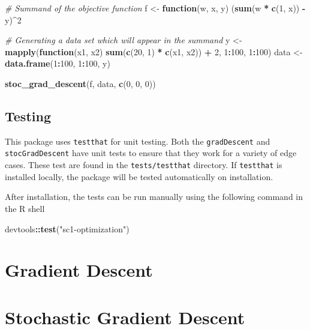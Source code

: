 \documentclass[12pt,]{article}
\newenvironment{Shaded}{\begin{snugshade}}{\end{snugshade}}
\newcommand{\CommentTok}[1]{\textcolor[rgb]{0.56,0.35,0.01}{\textit{#1}}}
\newcommand{\ControlFlowTok}[1]{\textcolor[rgb]{0.13,0.29,0.53}{\textbf{#1}}}
\newcommand{\DecValTok}[1]{\textcolor[rgb]{0.00,0.00,0.81}{#1}}
\newcommand{\KeywordTok}[1]{\textcolor[rgb]{0.13,0.29,0.53}{\textbf{#1}}}
\newcommand{\NormalTok}[1]{#1}
\newcommand{\OperatorTok}[1]{\textcolor[rgb]{0.81,0.36,0.00}{\textbf{#1}}}
\newcommand{\StringTok}[1]{\textcolor[rgb]{0.31,0.60,0.02}{#1}}
\begin{document}
\begin{Shaded}
\begin{Highlighting}[]
    \CommentTok{# Summand of the objective function}
\NormalTok{    f <-}\StringTok{ }\ControlFlowTok{function}\NormalTok{(w, x, y) (}\KeywordTok{sum}\NormalTok{(w }\OperatorTok{*}\StringTok{ }\KeywordTok{c}\NormalTok{(}\DecValTok{1}\NormalTok{, x)) }\OperatorTok{-}\StringTok{ }\NormalTok{y)}\OperatorTok{^}\DecValTok{2}

    \CommentTok{# Generating a data set which will appear in the summand}
\NormalTok{    y <-}\StringTok{ }\KeywordTok{mapply}\NormalTok{(}\ControlFlowTok{function}\NormalTok{(x1, x2) }\KeywordTok{sum}\NormalTok{(}\KeywordTok{c}\NormalTok{(}\DecValTok{20}\NormalTok{, }\DecValTok{1}\NormalTok{) }\OperatorTok{*}\StringTok{ }\KeywordTok{c}\NormalTok{(x1, x2)) }\OperatorTok{+}\StringTok{ }\DecValTok{2}\NormalTok{, }\DecValTok{1}\OperatorTok{:}\DecValTok{100}\NormalTok{, }\DecValTok{1}\OperatorTok{:}\DecValTok{100}\NormalTok{)}
\NormalTok{    data <-}\StringTok{ }\KeywordTok{data.frame}\NormalTok{(}\DecValTok{1}\OperatorTok{:}\DecValTok{100}\NormalTok{, }\DecValTok{1}\OperatorTok{:}\DecValTok{100}\NormalTok{, y)}

    \KeywordTok{stoc_grad_descent}\NormalTok{(f, data, }\KeywordTok{c}\NormalTok{(}\DecValTok{0}\NormalTok{, }\DecValTok{0}\NormalTok{, }\DecValTok{0}\NormalTok{))}
\end{Highlighting}
\end{Shaded}

\hypertarget{testing}{%
\subsection{Testing}\label{testing}}

This package uses \texttt{testthat} for unit testing. Both the
\texttt{gradDescent} and \texttt{stocGradDescent} have unit tests to
ensure that they work for a variety of edge cases. These test are found
in the \texttt{tests/testthat} directory. If \texttt{testthat} is
installed locally, the package will be tested automatically on
installation.

After installation, the tests can be run manually using the following
command in the R shell

\begin{Shaded}
\begin{Highlighting}[]
\NormalTok{    devtools}\OperatorTok{::}\KeywordTok{test}\NormalTok{(}\StringTok{"sc1-optimization"}\NormalTok{)}
\end{Highlighting}
\end{Shaded}

\newpage

\hypertarget{gradient-descent}{%
\section{Gradient Descent}\label{gradient-descent}}

\newpage

\hypertarget{stochastic-gradient-descent}{%
\section{Stochastic Gradient
Descent}\label{stochastic-gradient-descent}}
\end{document}
